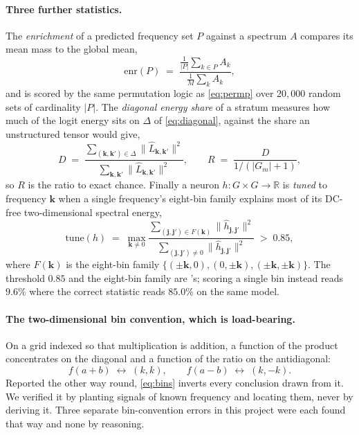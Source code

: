 \paragraph{Three further statistics.} The \emph{enrichment} of a predicted
frequency set $P$ against a spectrum $A$ compares its mean mass to the global mean,
\begin{equation}
  \label{eq:enrich}
  \mathrm{enr}(P) \;=\;
  \frac{\frac{1}{|P|}\sum_{k \in P} A_{k}}{\frac{1}{M}\sum_{k} A_{k}} ,
\end{equation}
and is scored by the same permutation logic as \eqref{eq:permp} over $20{,}000$ random sets of
cardinality $|P|$. The \emph{diagonal energy share} of a stratum measures how much of the
logit energy sits on $\Delta$ of \eqref{eq:diagonal}, against the share an unstructured tensor
would give,
\begin{equation}
  \label{eq:dshare}
  D \;=\; \frac{\sum_{(\mathbf{k},\mathbf{k}') \in \Delta} \lVert \widehat{L}_{\mathbf{k},\mathbf{k}'} \rVert^{2}}
               {\sum_{\mathbf{k},\mathbf{k}'} \lVert \widehat{L}_{\mathbf{k},\mathbf{k}'} \rVert^{2}} ,
  \qquad
  R \;=\; \frac{D}{1 / (|G_{m}| + 1)} ,
\end{equation}
so $R$ is the ratio to exact chance. Finally a neuron $h : G \times G \to \mathbb{R}$ is
\emph{tuned} to frequency $\mathbf{k}$ when a single frequency's eight-bin family explains
most of its DC-free two-dimensional spectral energy,
\begin{equation}
  \label{eq:tuned}
  \mathrm{tune}(h) \;=\; \max_{\mathbf{k} \neq 0}
  \frac{\sum_{(\mathbf{j},\mathbf{j}') \in F(\mathbf{k})} \lVert \widehat{h}_{\mathbf{j},\mathbf{j}'} \rVert^{2}}
       {\sum_{(\mathbf{j},\mathbf{j}') \neq 0} \lVert \widehat{h}_{\mathbf{j},\mathbf{j}'} \rVert^{2}}
  \;>\; 0.85 ,
\end{equation}
where $F(\mathbf{k})$ is the eight-bin family $\{(\pm\mathbf{k}, 0), (0, \pm\mathbf{k}),
(\pm\mathbf{k}, \pm\mathbf{k})\}$. The threshold $0.85$ and the eight-bin family are
\citet{nanda2023progress}'s; scoring a single bin instead reads $9.6\%$ where the correct
statistic reads $85.0\%$ on the same model.

\paragraph{The two-dimensional bin convention, which is load-bearing.} On a grid indexed so
that multiplication is addition, a function of the product concentrates on the diagonal and a
function of the ratio on the antidiagonal:
\begin{equation}
  \label{eq:bins}
  f(a + b) \;\longleftrightarrow\; (k, k),
  \qquad
  f(a - b) \;\longleftrightarrow\; (k, -k).
\end{equation}
Reported the other way round, \eqref{eq:bins} inverts every conclusion drawn from it. We
verified it by planting signals of known frequency and locating them, never by deriving it.
Three separate bin-convention errors in this project were each found that way and none by
reasoning.

